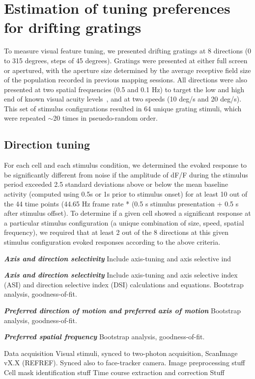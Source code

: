 \section{Estimation of tuning preferences for drifting gratings}
To measure visual feature tuning, we presented drifting gratings at 8 directions (0 to 315 degrees, steps of 45 degrees). Gratings were presented at either full screen or apertured, with the aperture size determined by the average receptive field size of the population recorded in previous  mapping sessions.  All directions were also presented at two spatial frequencies (0.5 and 0.1 Hz) to target the low and high end of known visual acuity levels~\cite{stuff}, and at two speeds (10 deg/s and 20 deg/s). This set of stimulus configurations resulted in 64 unique grating stimuli, which were repeated $\sim$20 times in pseuedo-random order.

\subsection{Direction tuning}
For each cell and each stimulus condition, we determined the evoked response to be significantly different from noise if the amplitude of dF/F during the stimulus period exceeded 2.5 standard deviations above or below the mean baseline activity (computed using 0.5s or 1s prior to stimulus onset) for at least 10 out of the 44 time points (44.65 Hz frame rate * (0.5 s stimulus presentation + 0.5 s after stimulus offset).
To determine if a given cell showed a significant response at a particular stimulus configuration (a unique combination of size, speed, spatial frequency), we required that at least 2 out of the 8 directions at this given stimulus configuration evoked responses according to the above criteria. 


\textbf{\textit{Axis and direction selectivity}}
Include axis-tuning and axis selective ind

\textbf{\textit{Axis and direction selectivity}}
Include axis-tuning and axis selective index (ASI) and direction selective index (DSI) calculations and equations. Bootstrap analysis, goodness-of-fit.

\textbf{\textit{Preferred direction of motion and preferred axis of motion}}
Bootstrap analysis, goodness-of-fit.

\textbf{\textit{Preferred spatial frequency}}
Bootstrap analysis, goodness-of-fit.




Data acquisition
Visual stimuli, synced to two-photon acquisition, ScanImage vX.X (REFREF). 
Synced also to face-tracker camera.
Image preprocessing
stuff
Cell mask identification
stuff
Time course extraction and correction
Stuff


